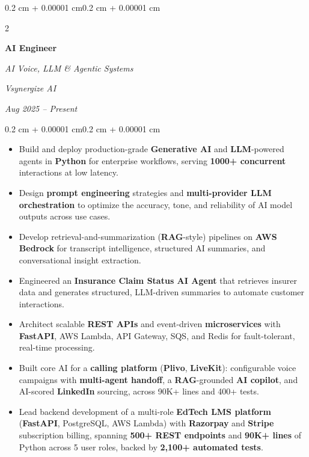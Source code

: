 \documentclass[10pt, letterpaper]{article}
\newenvironment{highlights}{
    \begin{itemize}[
        topsep=0.03 cm,
        parsep=0.03 cm,
        partopsep=0pt,
        itemsep=0pt,
        leftmargin=0.4 cm + 10pt
    ]
}{
    \end{itemize}
}
\newenvironment{onecolentry}{
    \begin{adjustwidth}{0.2 cm + 0.00001 cm}{0.2 cm + 0.00001 cm}
}{
    \end{adjustwidth}
}
\newenvironment{twocolentry}[2][]{
    \onecolentry
    \def\secondColumn{#2}
    \setcolumnwidth{\fill, 4.5 cm}
    \begin{paracol}{2}
}{
    \switchcolumn \raggedleft \secondColumn
    \end{paracol}
    \endonecolentry
}
\begin{document}
        \begin{twocolentry}{
        \textit{Vsynergize AI}

        \textit{Aug 2025 -- Present}}
            \textbf{AI Engineer}

            \textit{AI Voice, LLM \& Agentic Systems}
        \end{twocolentry}

        \vspace{0.06 cm}
        \begin{onecolentry}
            \begin{highlights}
                \item Build and deploy production-grade \textbf{Generative AI} and \textbf{LLM}-powered agents in \textbf{Python} for enterprise workflows, serving \textbf{1000+ concurrent} interactions at low latency.
                \item Design \textbf{prompt engineering} strategies and \textbf{multi-provider LLM orchestration} to optimize the accuracy, tone, and reliability of AI model outputs across use cases.
                \item Develop retrieval-and-summarization (\textbf{RAG}-style) pipelines on \textbf{AWS Bedrock} for transcript intelligence, structured AI summaries, and conversational insight extraction.
                \item Engineered an \textbf{Insurance Claim Status AI Agent} that retrieves insurer data and generates structured, LLM-driven summaries to automate customer interactions.
                \item Architect scalable \textbf{REST APIs} and event-driven \textbf{microservices} with \textbf{FastAPI}, AWS Lambda, API Gateway, SQS, and Redis for fault-tolerant, real-time processing.
                \item Built core AI for a \textbf{calling platform} (\textbf{Plivo}, \textbf{LiveKit}): configurable voice campaigns with \textbf{multi-agent handoff}, a \textbf{RAG}-grounded \textbf{AI copilot}, and AI-scored \textbf{LinkedIn} sourcing, across 90K+ lines and 400+ tests.
                \item Lead backend development of a multi-role \textbf{EdTech LMS platform} (\textbf{FastAPI}, PostgreSQL, AWS Lambda) with \textbf{Razorpay} and \textbf{Stripe} subscription billing, spanning \textbf{500+ REST endpoints} and \textbf{90K+ lines} of Python across 5 user roles, backed by \textbf{2,100+ automated tests}.
            \end{highlights}
        \end{onecolentry}
\end{document}
